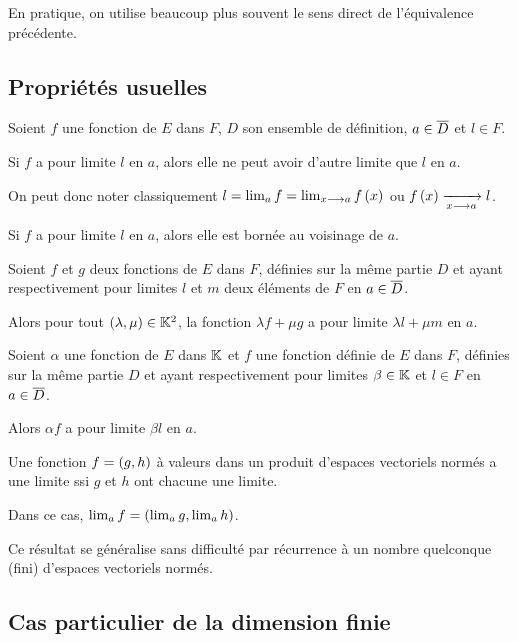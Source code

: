 En pratique, on utilise beaucoup plus souvent le sens direct de l'équivalence précédente.

\subsection{Propriétés usuelles}

\begin{prop}
Soient \(f\) une fonction de \(E\) dans \(F\), \(D\) son ensemble de définition, \(a\in\overline{D}\) et \(l\in F\).

Si \(f\) a pour limite \(l\) en \(a\), alors elle ne peut avoir d'autre limite que \(l\) en \(a\).

On peut donc noter classiquement \(l=\lim_af=\lim_{x\longrightarrow a}f\left(x\right)\) ou \(f\left(x\right)\xrightarrow[x\longrightarrow a]{}l\).
\end{prop}

\begin{prop}
Si \(f\) a pour limite \(l\) en \(a\), alors elle est bornée au voisinage de \(a\).
\end{prop}

\begin{theo}
Soient \(f\) et \(g\) deux fonctions de \(E\) dans \(F\), définies sur la même partie \(D\) et ayant respectivement pour limites \(l\) et \(m\) deux éléments de \(F\) en \(a\in\overline{D}\).

Alors pour tout \(\left(\lambda,\mu\right)\in\mathbb{K}^2\), la fonction \(\lambda f+\mu g\) a pour limite \(\lambda l+\mu m\) en \(a\).

Soient \(\alpha\) une fonction de \(E\) dans \(\mathbb{K}\) et \(f\) une fonction définie de \(E\) dans \(F\), définies sur la même partie \(D\) et ayant respectivement pour limites \(\beta\in\mathbb{K}\) et \(l\in F\) en \(a\in\overline{D}\).

Alors \(\alpha f\) a pour limite \(\beta l\) en \(a\).
\end{theo}

\begin{prop}
Une fonction \(f=\left(g,h\right)\) à valeurs dans un produit d'espaces vectoriels normés a une limite ssi \(g\) et \(h\) ont chacune une limite.

Dans ce cas, \(\lim_af=\left(\lim_ag,\lim_ah\right)\).

Ce résultat se généralise sans difficulté par récurrence à un nombre quelconque (fini) d'espaces vectoriels normés.
\end{prop}

\subsection{Cas particulier de la dimension finie}

